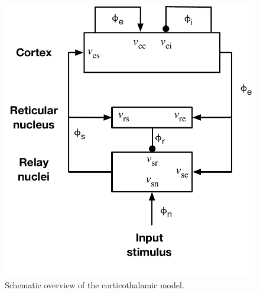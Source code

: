\documentclass[preprint,review,10pt,authoryear,letterpaper]{elsarticle}
\begin{document}
\begin{figure}[!b]
\begin{center}
\includegraphics[width=0.40\columnwidth]{EIRS_clean}
\caption{Schematic overview of the corticothalamic model.}
\label{fig:ct_schematic}
\end{center}
\end{figure}
\end{document}
